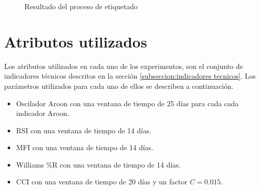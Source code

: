 \documentclass[12pt]{scrbook}
\theoremstyle{break}
\theoremstyle{break}
\begin{document}
\begin{figure}[ht]
\centering
{}
\caption{\label{imagen:etiquetado} Resultado del proceso de etiquetado}
\end{figure}

\section{Atributos utilizados}
\label{seccion:atributos}
Los atributos utilizados en cada uno de los experimentos, son el conjunto de indicadores técnicos descritos en la sección \ref{subseccion:indicadores tecnicos}. Los parámetros utilizados para cada uno de ellos se describen a continuación.


\begin{itemize}
\item Oscilador Aroon con una ventana de tiempo de 25 días para cada cada indicador Aroon.

\item RSI con una ventana de tiempo de 14 días.

\item MFI con una ventana de tiempo de 14 días.

\item Williams \%R con una ventana de tiempo de 14 días.

\item CCI con una ventana de tiempo de 20 días y un factor $C=0.015$.
\end{itemize}
\end{document}
